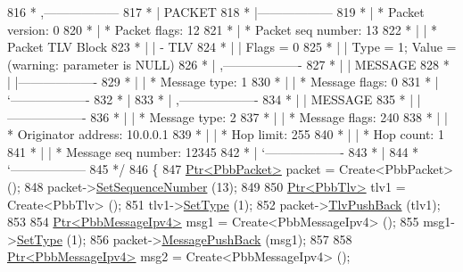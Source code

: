 \begin{DoxyCode}
816 \textcolor{comment}{         * ,------------------}
817 \textcolor{comment}{         * |  PACKET}
818 \textcolor{comment}{         * |------------------}
819 \textcolor{comment}{         * | * Packet version:    0}
820 \textcolor{comment}{         * | * Packet flags:  12}
821 \textcolor{comment}{         * | * Packet seq number: 13}
822 \textcolor{comment}{         * |    | * Packet TLV Block}
823 \textcolor{comment}{         * |    |     - TLV}
824 \textcolor{comment}{         * |    |         Flags = 0}
825 \textcolor{comment}{         * |    |         Type = 1; Value = (warning: parameter is NULL)}
826 \textcolor{comment}{         * |    ,-------------------}
827 \textcolor{comment}{         * |    |  MESSAGE}
828 \textcolor{comment}{         * |    |-------------------}
829 \textcolor{comment}{         * |    | * Message type:       1}
830 \textcolor{comment}{         * |    | * Message flags:  0}
831 \textcolor{comment}{         * |    `-------------------}
832 \textcolor{comment}{         * |}
833 \textcolor{comment}{         * |    ,-------------------}
834 \textcolor{comment}{         * |    |  MESSAGE}
835 \textcolor{comment}{         * |    |-------------------}
836 \textcolor{comment}{         * |    | * Message type:       2}
837 \textcolor{comment}{         * |    | * Message flags:  240}
838 \textcolor{comment}{         * |    | * Originator address: 10.0.0.1}
839 \textcolor{comment}{         * |    | * Hop limit:          255}
840 \textcolor{comment}{         * |    | * Hop count:          1}
841 \textcolor{comment}{         * |    | * Message seq number: 12345}
842 \textcolor{comment}{         * |    `-------------------}
843 \textcolor{comment}{         * |}
844 \textcolor{comment}{         * `------------------}
845 \textcolor{comment}{   */}
846   \{
847     \hyperlink{classns3_1_1Ptr}{Ptr<PbbPacket>} packet = Create<PbbPacket> ();
848     packet->\hyperlink{classns3_1_1PbbPacket_a7d6a1602be86109760d0f26ff9bbbb8e}{SetSequenceNumber} (13);
849 
850     \hyperlink{classns3_1_1Ptr}{Ptr<PbbTlv>} tlv1 = Create<PbbTlv> ();
851     tlv1->\hyperlink{classns3_1_1PbbTlv_a90a0452018ed364ac37c3ad116dd718b}{SetType} (1);
852     packet->\hyperlink{classns3_1_1PbbPacket_a34935793e729a106c176db99c969cb42}{TlvPushBack} (tlv1);
853 
854     \hyperlink{classns3_1_1Ptr}{Ptr<PbbMessageIpv4>} msg1 = Create<PbbMessageIpv4> ();
855     msg1->\hyperlink{classns3_1_1PbbMessage_a4b3d1eaabd3e7412a46ac79bf3360dac}{SetType} (1);
856     packet->\hyperlink{classns3_1_1PbbPacket_a4a3170001ef758d9c9c4375b8f089826}{MessagePushBack} (msg1);
857 
858     \hyperlink{classns3_1_1Ptr}{Ptr<PbbMessageIpv4>} msg2 = Create<PbbMessageIpv4> ();

\end{DoxyCode}
